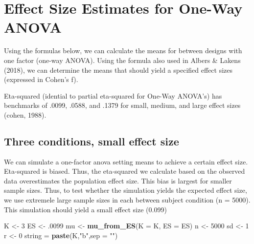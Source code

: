 \documentclass[]{book}
\newenvironment{Shaded}{\begin{snugshade}}{\end{snugshade}}
\newcommand{\DataTypeTok}[1]{\textcolor[rgb]{0.13,0.29,0.53}{#1}}
\newcommand{\DecValTok}[1]{\textcolor[rgb]{0.00,0.00,0.81}{#1}}
\newcommand{\FloatTok}[1]{\textcolor[rgb]{0.00,0.00,0.81}{#1}}
\newcommand{\KeywordTok}[1]{\textcolor[rgb]{0.13,0.29,0.53}{\textbf{#1}}}
\newcommand{\NormalTok}[1]{#1}
\newcommand{\StringTok}[1]{\textcolor[rgb]{0.31,0.60,0.02}{#1}}
\begin{document}
\hypertarget{effect-size-estimates-for-one-way-anova}{%
\section{Effect Size Estimates for One-Way ANOVA}\label{effect-size-estimates-for-one-way-anova}}

Using the formulas below, we can calculate the means for between designs with one factor (one-way ANOVA). Using the formula also used in Albers \& Lakens (2018), we can determine the means that should yield a specified effect sizes (expressed in Cohen's f).

Eta-squared (idential to partial eta-squared for One-Way ANOVA's) has benchmarks of .0099, .0588, and .1379 for small, medium, and large effect sizes (cohen, 1988).

\hypertarget{three-conditions-small-effect-size}{%
\subsection{Three conditions, small effect size}\label{three-conditions-small-effect-size}}

We can simulate a one-factor anova setting means to achieve a certain effect size. Eta-squared is biased. Thus, the eta-squared we calculate based on the observed data overestimates the population effect size. This bias is largest for smaller sample sizes. Thus, to test whether the simulation yields the expected effect size, we use extremele large sample sizes in each between subject condition (n = 5000). This simulation should yield a small effect size (0.099)

\begin{Shaded}
\begin{Highlighting}[]
\NormalTok{K <-}\StringTok{ }\DecValTok{3}
\NormalTok{ES <-}\StringTok{ }\FloatTok{.0099}
\NormalTok{mu <-}\StringTok{ }\KeywordTok{mu_from_ES}\NormalTok{(}\DataTypeTok{K =}\NormalTok{ K, }\DataTypeTok{ES =}\NormalTok{ ES)}
\NormalTok{n <-}\StringTok{ }\DecValTok{5000}
\NormalTok{sd <-}\StringTok{ }\DecValTok{1}
\NormalTok{r <-}\StringTok{ }\DecValTok{0}
\NormalTok{string =}\StringTok{ }\KeywordTok{paste}\NormalTok{(K,}\StringTok{"b"}\NormalTok{,}\DataTypeTok{sep =} \StringTok{""}\NormalTok{)}
\end{Highlighting}
\end{Shaded}
\end{document}

